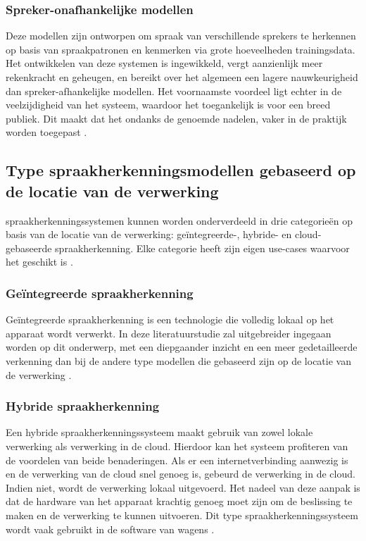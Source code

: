 \subsubsection{Spreker-onafhankelijke modellen}
Deze modellen zijn ontworpen om spraak van verschillende sprekers te herkennen op basis van spraakpatronen en kenmerken via grote hoeveelheden trainingsdata. Het ontwikkelen van deze systemen is ingewikkeld, vergt aanzienlijk meer rekenkracht en geheugen, en bereikt over het algemeen een lagere nauwkeurigheid dan spreker-afhankelijke modellen. Het voornaamste voordeel ligt echter in de veelzijdigheid van het systeem, waardoor het toegankelijk is voor een breed publiek. Dit maakt dat het ondanks de genoemde nadelen, vaker in de praktijk worden toegepast \autocite{Vimala2012}.

\subsection{Type spraakherkenningsmodellen gebaseerd op de locatie van de verwerking}
spraakherkenningssystemen kunnen worden onderverdeeld in drie categorieën op basis van de locatie van de verwerking: geïntegreerde-, hybride- en cloud-gebaseerde spraakherkenning. Elke categorie heeft zijn eigen use-cases waarvoor het geschikt is \autocite{Leitman2020}.

\subsubsection{Geïntegreerde spraakherkenning}
Geïntegreerde spraakherkenning is een technologie die volledig lokaal op het apparaat wordt verwerkt. In deze literatuurstudie zal uitgebreider ingegaan worden op dit onderwerp, met een diepgaander inzicht en een meer gedetailleerde verkenning dan bij de andere type modellen die gebaseerd zijn op de locatie van de verwerking \autocite{Leitman2020}.

\subsubsection{Hybride spraakherkenning}
Een hybride spraakherkenningssysteem maakt gebruik van zowel lokale verwerking als verwerking in de cloud. Hierdoor kan het systeem profiteren van de voordelen van beide benaderingen. Als er een internetverbinding aanwezig is en de verwerking van de cloud snel genoeg is, gebeurd de verwerking in de cloud. Indien niet, wordt de verwerking lokaal uitgevoerd. Het nadeel van deze aanpak is dat de hardware van het apparaat krachtig genoeg moet zijn om de beslissing te maken en de verwerking te kunnen uitvoeren. Dit type spraakherkenningssysteem wordt vaak gebruikt in de software van wagens \autocite{Leitman2020}.

